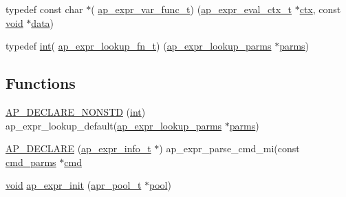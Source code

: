\begin{DoxyCompactItemize}
\item 
typedef const char $\ast$( \hyperlink{group__AP__EXPR_ga7f4e46bc4e3f27e1ca50e59e45b6cc77}{ap\+\_\+expr\+\_\+var\+\_\+func\+\_\+t}) (\hyperlink{structap__expr__eval__ctx__t}{ap\+\_\+expr\+\_\+eval\+\_\+ctx\+\_\+t} $\ast$\hyperlink{group__APR__Util__Bucket__Brigades_ga0525238c5b09cb4ac5067ddec654d09c}{ctx}, const \hyperlink{group__MOD__ISAPI_gacd6cdbf73df3d9eed42fa493d9b621a6}{void} $\ast$\hyperlink{structdata}{data})
\item 
typedef \hyperlink{pcre_8txt_a42dfa4ff673c82d8efe7144098fbc198}{int}( \hyperlink{group__AP__EXPR_gad1cddcb03e188322dedbc6021e12f7ea}{ap\+\_\+expr\+\_\+lookup\+\_\+fn\+\_\+t}) (\hyperlink{structap__expr__lookup__parms}{ap\+\_\+expr\+\_\+lookup\+\_\+parms} $\ast$\hyperlink{group__APACHE__CORE__CONFIG_ga3e664e44484c440b3d2347dcf848ab85}{parms})
\end{DoxyCompactItemize}
\subsection*{Functions}
\begin{DoxyCompactItemize}
\item 
\hyperlink{group__AP__EXPR_ga1ac0588c7c2ca64ea23710360d5f6f85}{A\+P\+\_\+\+D\+E\+C\+L\+A\+R\+E\+\_\+\+N\+O\+N\+S\+TD} (\hyperlink{pcre_8txt_a42dfa4ff673c82d8efe7144098fbc198}{int}) ap\+\_\+expr\+\_\+lookup\+\_\+default(\hyperlink{structap__expr__lookup__parms}{ap\+\_\+expr\+\_\+lookup\+\_\+parms} $\ast$\hyperlink{group__APACHE__CORE__CONFIG_ga3e664e44484c440b3d2347dcf848ab85}{parms})
\item 
\hyperlink{group__AP__EXPR_ga130e11b78a562abb6ec795be9fca38cd}{A\+P\+\_\+\+D\+E\+C\+L\+A\+RE} (\hyperlink{structap__expr__info__t}{ap\+\_\+expr\+\_\+info\+\_\+t} $\ast$) ap\+\_\+expr\+\_\+parse\+\_\+cmd\+\_\+mi(const \hyperlink{group__APACHE__CORE__CONFIG_ga1791fbd28d06a9847bad001541c5241e}{cmd\+\_\+parms} $\ast$\hyperlink{group__apr__thread__proc_ga7b715f5a87a71c6766684c1798251237}{cmd}
\item 
\hyperlink{group__MOD__ISAPI_gacd6cdbf73df3d9eed42fa493d9b621a6}{void} \hyperlink{group__AP__EXPR_gaeadb4dd705bf55c9634480632c456acc}{ap\+\_\+expr\+\_\+init} (\hyperlink{structapr__pool__t}{apr\+\_\+pool\+\_\+t} $\ast$\hyperlink{group__APR__XLATE_gabb3cd978f04c73d0b763c391e9bfde73}{pool})
\end{DoxyCompactItemize}
